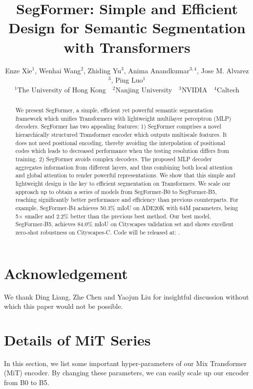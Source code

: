 \documentclass{article}
\title{SegFormer: Simple and Efficient Design for Semantic Segmentation with Transformers}
\author{
Enze Xie$^1$,
Wenhai Wang$^2$,
Zhiding Yu$^3$,
Anima Anandkumar$^{3,4}$,
Jose M. Alvarez$^3$,
Ping Luo$^1$
\\ [0.25cm]
$^1$The University of Hong Kong~~$^2$Nanjing University~~$^3$NVIDIA~~$^4$Caltech
}
\begin{document}
\maketitle

\begin{abstract}
We present SegFormer, a simple, efficient yet powerful semantic segmentation framework which unifies Transformers with lightweight multilayer perceptron (MLP) decoders. SegFormer has two appealing features: 1) SegFormer comprises a novel  hierarchically structured Transformer encoder which  outputs multiscale features. It does not need positional encoding, thereby avoiding the interpolation of positional codes which leads to decreased performance when the testing resolution differs from training. 2) SegFormer avoids complex decoders. The proposed MLP decoder aggregates information from different layers, and thus combining both local attention and global attention to render powerful representations. We show that this simple and lightweight design is the key to efficient segmentation on Transformers. 
We scale our approach up to obtain a series of models from SegFormer-B0 to SegFormer-B5, reaching significantly better performance and efficiency than previous counterparts.
For example, SegFormer-B4 achieves 50.3\% mIoU on ADE20K with 64M parameters, being 5$\times$ smaller and 2.2\% better than the previous best method. Our best model, SegFormer-B5, achieves 84.0\% mIoU on Cityscapes validation set and shows excellent zero-shot robustness on Cityscapes-C. 
Code will be released at: 
\href{https://github.com/NVlabs/SegFormer}{\color{blue}{$\tt github.com/NVlabs/SegFormer$}}.
\end{abstract}









\section*{Acknowledgement}
We thank Ding Liang, Zhe Chen and Yaojun Liu for insightful discussion without which this paper would not be possible.

\appendix

\section{Details of MiT Series}
In this section, we list some important hyper-parameters of our Mix Transformer (MiT) encoder. By changing these parameters, we can easily scale up our encoder from B0 to B5.
\end{document}
